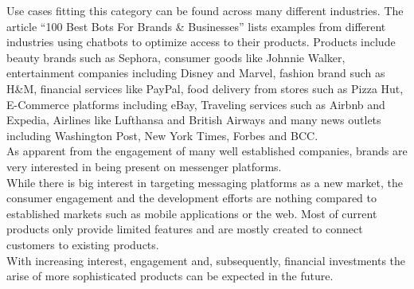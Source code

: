 Use cases fitting this category can be found across many different industries. The article ``100 Best Bots For Brands \& Businesses''\cite{topbots} lists examples from different industries using chatbots to optimize access to their products. Products include beauty brands such as Sephora, consumer goods like Johnnie Walker, entertainment companies including Disney and Marvel, fashion brand such as H\&M, financial services like PayPal, food delivery from stores such as Pizza Hut, E-Commerce platforms including eBay, Traveling services such as Airbnb and Expedia, Airlines like Lufthansa and British Airways and many news outlets including Washington Post, New York Times, Forbes and BCC.
\\


As apparent from the engagement of many well established companies, brands are very interested in being present on messenger platforms.
\\

While there is big interest in targeting messaging platforms as a new market, the consumer engagement and the development efforts are nothing compared to established markets such as mobile applications or the web. Most of current products only provide limited features and are mostly created to connect customers to existing products.
\\

With increasing interest, engagement and, subsequently, financial investments the arise of more sophisticated products can be expected in the future.
